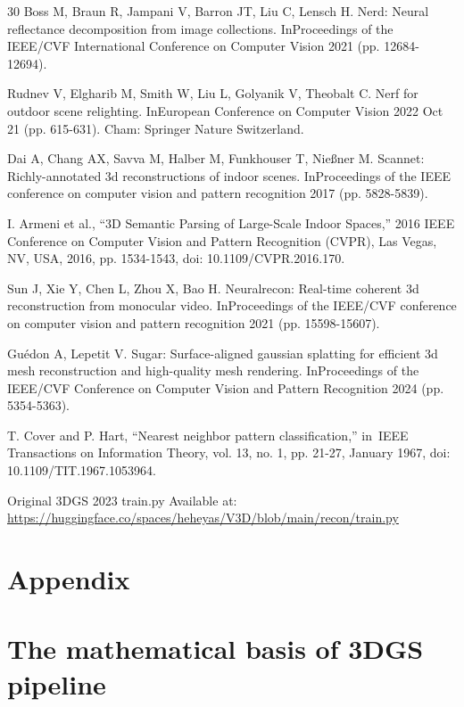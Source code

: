 \documentclass[11pt,a4paper]{article}
\begin{document}
\begin{thebibliography}{30}
Boss M, Braun R, Jampani V, Barron JT, Liu C, Lensch H. Nerd: Neural reflectance decomposition from image collections. InProceedings of the IEEE/CVF International Conference on Computer Vision 2021 (pp. 12684-12694).

Rudnev V, Elgharib M, Smith W, Liu L, Golyanik V, Theobalt C. Nerf for outdoor scene relighting. InEuropean Conference on Computer Vision 2022 Oct 21 (pp. 615-631). Cham: Springer Nature Switzerland.

Dai A, Chang AX, Savva M, Halber M, Funkhouser T, Nießner M. Scannet: Richly-annotated 3d reconstructions of indoor scenes. InProceedings of the IEEE conference on computer vision and pattern recognition 2017 (pp. 5828-5839).

I. Armeni et al., ``3D Semantic Parsing of Large-Scale Indoor Spaces,'' 2016 IEEE Conference on Computer Vision and Pattern Recognition (CVPR), Las Vegas, NV, USA, 2016, pp. 1534-1543, doi: 10.1109/CVPR.2016.170.

Sun J, Xie Y, Chen L, Zhou X, Bao H. Neuralrecon: Real-time coherent 3d reconstruction from monocular video. InProceedings of the IEEE/CVF conference on computer vision and pattern recognition 2021 (pp. 15598-15607).

Guédon A, Lepetit V. Sugar: Surface-aligned gaussian splatting for efficient 3d mesh reconstruction and high-quality mesh rendering. InProceedings of the IEEE/CVF Conference on Computer Vision and Pattern Recognition 2024 (pp. 5354-5363).

T. Cover and P. Hart, ``Nearest neighbor pattern classification,'' in~IEEE Transactions on Information Theory, vol. 13, no. 1, pp. 21-27, January 1967, doi: 10.1109/TIT.1967.1053964.

Original 3DGS 2023 train.py Available at: \url{https://huggingface.co/spaces/heheyas/V3D/blob/main/recon/train.py}

\end{thebibliography}

\clearpage
\appendix
{}
{}
\section*{Appendix}

\section{The mathematical basis of 3DGS pipeline}
\end{document}
